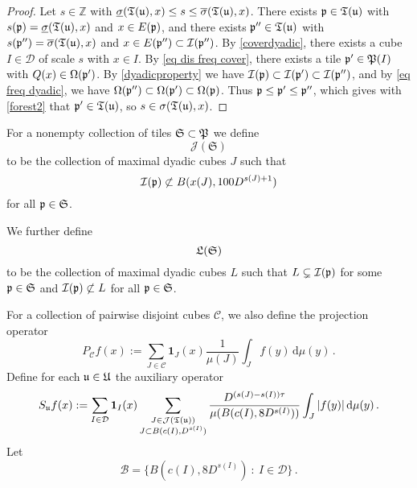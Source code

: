 \begin{proof}
    Let $s \in \mathbb{Z}$ with $\underline{\sigma} (\mathfrak T(\mathfrak u), x) \le s \le \overline{\sigma} (\mathfrak T(\mathfrak u), x)$. There exists $\mathfrak p \in \mathfrak T(\mathfrak u)$ with $s(\mathfrak p) = \underline{\sigma} (\mathfrak T(\mathfrak u), x)$ and $x \in E(\mathfrak p)$, and there exists $\mathfrak p'' \in \mathfrak T(\mathfrak u)$ with $s(\mathfrak p'') = \overline{\sigma} (\mathfrak T(\mathfrak u), x)$ and $x \in E(\mathfrak p'') \subset \mathcal{I}(\mathfrak p'')$. By \eqref{coverdyadic}, there exists a cube $I \in \mathcal{D}$ of scale $s$ with $x \in I$. By \eqref{eq dis freq cover}, there exists a tile $\mathfrak p' \in \mathfrak P(I)$ with $Q(x) \in \Omega(\mathfrak p')$. By \eqref{dyadicproperty}  we have $\mathcal{I}(\mathfrak p) \subset \mathcal{I}(\mathfrak p') \subset \mathcal{I}(\mathfrak p'')$, and by \eqref{eq freq dyadic}, we have $\Omega(\mathfrak p'') \subset \Omega(\mathfrak p') \subset \Omega(\mathfrak p)$. Thus $\mathfrak p \le \mathfrak p' \le\mathfrak p''$, which gives with \eqref{forest2} that $\mathfrak p' \in \mathfrak T(\mathfrak u)$, so $s \in \sigma(\mathfrak T(\mathfrak u), x)$.
\end{proof}

For a nonempty collection of tiles $\mathfrak{S} \subset \mathfrak P$ we define
$$
    \mathcal{J}(\mathfrak{S})
$$
to be the collection of maximal dyadic cubes $J$ such that
$$
    \mathcal{I}(\mathfrak p) \not\subset B(x(J), 100D^{s(J) + 1})
$$
for all $\mathfrak p \in \mathfrak{S}$.

We further define
$$
    \mathfrak L(\mathfrak{S})
$$
to be the collection of maximal dyadic cubes $L$ such that $L \subsetneq \mathcal{I}(\mathfrak p)$ for some $\mathfrak p \in \mathfrak{S}$ and $\mathcal{I}(\mathfrak p) \not\subset L$ for all $\mathfrak p \in \mathfrak{S}$. 


For a collection of pairwise disjoint cubes $\mathcal{C}$, we also define the projection operator
$$
    P_{\mathcal{C}}f(x) :=\sum_{J\in\mathcal{C}}\mathbf{1}_J(x) \frac{1}{\mu(J)}\int_J f(y) \, \mathrm{d}\mu(y)\,.
$$
Define for each $\mathfrak u \in \mathfrak U$ the auxiliary operator
\begin{equation}
    \label{eq def S op}
    S_{\mathfrak u}f(x):=\sum_{I\in\mathcal{D}} \mathbf{1}_{I}(x) \sum_{\substack{J\in \mathcal{J}(\mathfrak T(\mathfrak u))\\
    J\subset B(c(I), D^{s(I)})}} \frac{D^{(s(J) - s(I))\tau}}{\mu(B(c(I), 8D^{s(I)}))}\int_J |f(y)| \, \mathrm{d}\mu(y)\,.
\end{equation}
Let
$$
    \mathcal{B} = \{B(c(I), 8D^{s(I)}) \ : \ I \in \mathcal{D}\}\,.
$$

